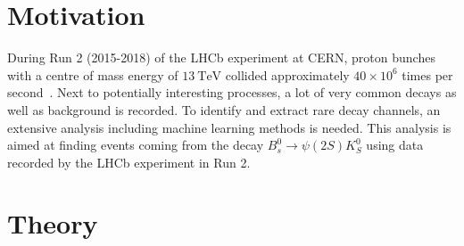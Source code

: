\section{Motivation}

During Run 2 (2015-2018) of the LHCb experiment at CERN, proton bunches with a centre of mass energy of $\qty{13}{\tera\electronvolt}$ collided approximately $40 \times 10^6$ times per second~\cite{LHCb_MVA}.
Next to potentially interesting processes, a lot of very common decays as well as background is recorded. To identify and extract rare decay channels, an extensive analysis including machine learning methods is needed.
This analysis is aimed at finding events coming from the decay $B_s^0 \to \psi (2S)K_S^0$ using data recorded by the LHCb experiment in Run 2. 

\section{Theory}
\label{sec:Theorie}

